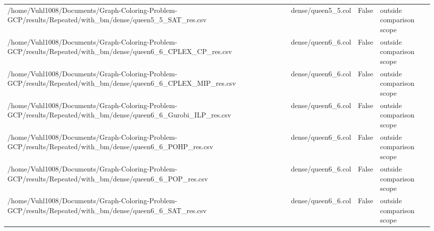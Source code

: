 \begin{table}[htbp]
\begin{tabular}{llll}
/home/Vuhl1008/Documents/Graph-Coloring-Problem-GCP/results/Repeated/with\_bm/dense/queen5\_5\_SAT\_res.csv & dense/queen5\_5.col & False & outside comparison scope \\
/home/Vuhl1008/Documents/Graph-Coloring-Problem-GCP/results/Repeated/with\_bm/dense/queen6\_6\_CPLEX\_CP\_res.csv & dense/queen6\_6.col & False & outside comparison scope \\
/home/Vuhl1008/Documents/Graph-Coloring-Problem-GCP/results/Repeated/with\_bm/dense/queen6\_6\_CPLEX\_MIP\_res.csv & dense/queen6\_6.col & False & outside comparison scope \\
/home/Vuhl1008/Documents/Graph-Coloring-Problem-GCP/results/Repeated/with\_bm/dense/queen6\_6\_Gurobi\_ILP\_res.csv & dense/queen6\_6.col & False & outside comparison scope \\
/home/Vuhl1008/Documents/Graph-Coloring-Problem-GCP/results/Repeated/with\_bm/dense/queen6\_6\_POHP\_res.csv & dense/queen6\_6.col & False & outside comparison scope \\
/home/Vuhl1008/Documents/Graph-Coloring-Problem-GCP/results/Repeated/with\_bm/dense/queen6\_6\_POP\_res.csv & dense/queen6\_6.col & False & outside comparison scope \\
/home/Vuhl1008/Documents/Graph-Coloring-Problem-GCP/results/Repeated/with\_bm/dense/queen6\_6\_SAT\_res.csv & dense/queen6\_6.col & False & outside comparison scope \\
\hline
\end{tabular}
\end{table}
